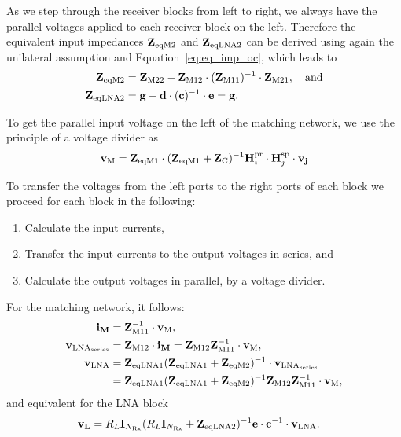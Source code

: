 As we step through the receiver blocks from left to right, we always have the parallel voltages applied to each receiver block on the left.
Therefore the equivalent input impedances $\mathbf{Z}_\text{eqM2}$ and $\mathbf{Z}_\text{eqLNA2}$ can be derived using again the unilateral assumption and Equation~\eqref{eq:eq_imp_oc}, which leads to
\begin{align}
\label{eq:zeqm2}
\mathbf{Z}_\text{eqM2} &= \mathbf{Z}_\text{M22} - \mathbf{Z}_\text{M12}\cdot(\mathbf{Z}_\text{M11})^{-1}\cdot\mathbf{Z}_\text{M21},\quad\text{and}\\
\label{eq:zeqlna2}
\mathbf{Z}_\text{eqLNA2} &= \mathbf{g} - \mathbf{d}\cdot(\mathbf{c})^{-1}\cdot\mathbf{e} = \mathbf{g}.
\end{align}

To get the parallel input voltage on the left of the matching network, we use the principle of a voltage divider as
\begin{equation}
\mathbf{v}_\text{M} = \mathbf{Z}_\text{eqM1}\cdot(\mathbf{Z}_\text{eqM1} + \mathbf{Z}_\text{C})^{-1} \mathbf{H}_i^{\text{pr}}\cdot\mathbf{H}_{j}^{\text{sp}}\cdot \mathbf{v_j}
\end{equation}

To transfer the voltages from the left ports to the right ports of each block we proceed for each block in the following: 
\begin{enumerate}
\item{Calculate the input currents,}
\item{Transfer the input currents to the output voltages in series, and}
\item{Calculate the output voltages in parallel, by a voltage divider.}
\end{enumerate}
For the matching network, it follows:
\begin{align}
\mathbf{i_M} &= \mathbf{Z}_\text{M11}^{-1}\cdot\mathbf{v}_\text{M},\\
\mathbf{v}_{\text{LNA}_\text{series}} &= \mathbf{Z}_\text{M12}\cdot\mathbf{i_M} = \mathbf{Z}_\text{M12} \mathbf{Z}_\text{M11}^{-1}\cdot\mathbf{v}_\text{M},\\
\mathbf{v}_\text{LNA} &= \mathbf{Z}_\text{eqLNA1}(\mathbf{Z}_\text{eqLNA1}+\mathbf{Z}_\text{eqM2})^{-1}\cdot\mathbf{v}_{\text{LNA}_\text{series}}\\\nonumber
&=\mathbf{Z}_\text{eqLNA1}(\mathbf{Z}_\text{eqLNA1}+\mathbf{Z}_\text{eqM2})^{-1}\mathbf{Z}_\text{M12} \mathbf{Z}_\text{M11}^{-1}\cdot\mathbf{v}_\text{M},
\end{align}
and equivalent for the LNA block
\begin{align}
\mathbf{v_{L}}&=R_L\mathbf{I}_{N_\text{Rx}}(R_L\mathbf{I}_{N_\text{Rx}}+\mathbf{Z}_\text{eqLNA2})^{-1}\mathbf{e}\cdot\mathbf{c}^{-1}\cdot\mathbf{v}_\text{LNA}.
\end{align}

